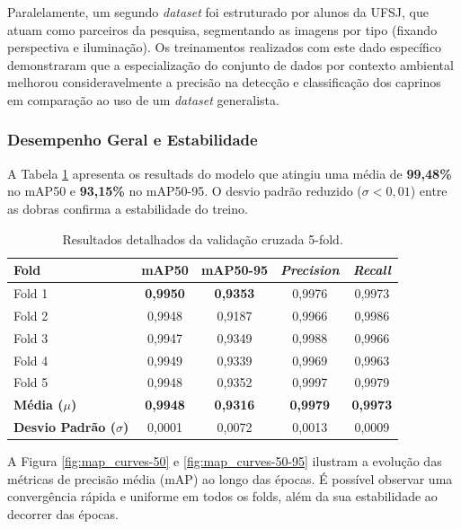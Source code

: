 \documentclass[12pt]{article}
\begin{document}
Paralelamente, um segundo \textit{dataset} foi estruturado por alunos da UFSJ, que atuam como parceiros da pesquisa, segmentando as imagens por tipo (fixando perspectiva e iluminação). Os treinamentos realizados com este dado específico demonstraram que a especialização do conjunto de dados por contexto ambiental melhorou consideravelmente a precisão na detecção e classificação dos caprinos em comparação ao uso de um \textit{dataset} generalista.



\subsubsection{Desempenho Geral e Estabilidade}

A Tabela \ref{tab:resultados_kfold} apresenta os resultads do modelo que atingiu uma média de \textbf{99,48\%} no mAP50 e \textbf{93,15\%} no mAP50-95. O desvio padrão reduzido ($\sigma < 0,01$) entre as dobras confirma a estabilidade do treino.

\begin{table}[!ht]
\centering
\caption{Resultados detalhados da validação cruzada 5-fold.}
\label{tab:resultados_kfold}
\begin{tabular}{lcccc}
\hline
\textbf{Fold} & \textbf{mAP50} & \textbf{mAP50-95} & \textbf{\textit{Precision}} & \textbf{\textit{Recall}} \\ \hline
Fold 1 & \textbf{0,9950} & \textbf{0,9353} & 0,9976 & 0,9973 \\
Fold 2 & 0,9948 & 0,9187 & 0,9966 & 0,9986 \\
Fold 3 & 0,9947 & 0,9349 & 0,9988 & 0,9966 \\
Fold 4 & 0,9949 & 0,9339 & 0,9969 & 0,9963 \\
Fold 5 & 0,9948 & 0,9352 & 0,9997 & 0,9979 \\ \hline
\textbf{Média ($\mu$)} & \textbf{0,9948} & \textbf{0,9316} & \textbf{0,9979} & \textbf{0,9973} \\
\textbf{Desvio Padrão ($\sigma$)} & 0,0001 & 0,0072 & 0,0013 & 0,0009 \\ \hline
\end{tabular}
\end{table}

A Figura \ref{fig:map_curves-50} e \ref{fig:map_curves-50-95} ilustram a evolução das métricas de precisão média (mAP) ao longo das épocas. É possível observar uma convergência rápida e uniforme em todos os folds, além da sua estabilidade ao decorrer das épocas.
\end{document}
